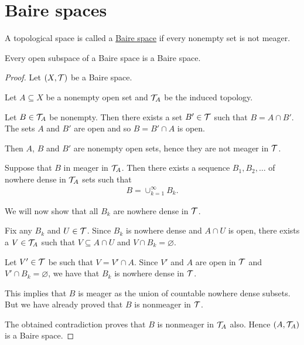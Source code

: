 \section{Baire spaces}\label{sec:baire_spaces}

\begin{definition}\label{def:baire_space}
  A topological space is called a \uline{Baire space} if every nonempty set is not meager.
\end{definition}

\begin{proposition}\label{thm:open_subspace_of_baire_space_is_baire}
  Every open subspace of a Baire space is a Baire space.
\end{proposition}
\begin{proof}
  Let $(X, \mathcal T)$ be a Baire space.

  Let $A \subseteq X$ be a nonempty open set and $\mathcal T_A$ be the induced topology.

  Let $B \in \mathcal T_A$ be nonempty. Then there exists a set $B' \in \mathcal T$ such that $B = A \cap B'$. The sets $A$ and $B'$ are open and so $B = B' \cap A$ is open.

  Then $A$, $B$ and $B'$ are nonempty open sets, hence they are not meager in $\mathcal T$.

  Suppose that $B$ in meager in $\mathcal T_A$. Then there exists a sequence $B_1, B_2, \ldots$ of nowhere dense in $\mathcal T_A$ sets such that
  \begin{align*}
    B = \cup_{k=1}^\infty B_k.
  \end{align*}

  We will now show that all $B_k$ are nowhere dense in $\mathcal T$.

  Fix any $B_k$ and $U \in \mathcal T$. Since $B_k$ is nowhere dense and $A \cap U$ is open, there exists a $V \in \mathcal T_A$ such that $V \subseteq A \cap U$ and $V \cap B_k = \varnothing$.

  Let $V' \in \mathcal T$ be such that $V = V' \cap A$. Since $V'$ and $A$ are open in $\mathcal T$ and $V' \cap B_k = \varnothing$, we have that $B_k$ is nowhere dense in $\mathcal T$.

  This implies that $B$ is meager as the union of countable nowhere dense subsets. But we have already proved that $B$ is nonmeager in $\mathcal T$.

  The obtained contradiction proves that $B$ is nonmeager in $\mathcal T_A$ also. Hence $(A, \mathcal T_A)$ is a Baire space.
\end{proof}
